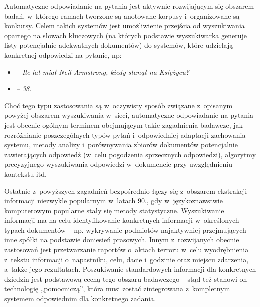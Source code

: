 \begin{multicols}{2}
Automatyczne odpowiadanie na pytania jest aktywnie rozwijającym się
obszarem badań, w~którego ramach tworzone są anotowane korpusy
i~organizowane są konkursy. Celem takich systemów jest umożliwienie
przejścia od wyszukiwania opartego na słowach kluczowych (na
których podstawie wyszukiwarka generuje listy potencjalnie
adekwatnych dokumentów) do systemów, które udzielają konkretnej
odpowiedzi na pytanie, np: 

\begin{itemize} 
  \item[] \textit{– Ile lat miał Neil Armstrong,
kiedy stanął na Księżycu?} 
  \item[] \textit{– 38. } 
\end{itemize} 

Choć tego typu zastosowania są w~oczywisty sposób związane
z~opisanym powyżej obszarem wyszukiwania w~sieci, automatyczne
odpowiadanie na pytania jest obecnie ogólnym terminem obejmującym
takie zagadnienia badawcze, jak rozróżnianie poszczególnych typów
pytań i~odpowiedniej adaptacji zachowania systemu, metody analizy
i~porównywania zbiorów dokumentów potencjalnie zawierających
odpowiedź (w~celu pogodzenia sprzecznych odpowiedzi), algorytmy
precyzyjnego wyszukiwania odpowiedzi w~dokumencie przy uwzględnieniu
kontekstu itd. 

Ostatnie z~powyższych zagadnień bezpośrednio łączy się
z~obszarem ekstrakcji informacji niezwykle popularnym w~latach 90.,
gdy w~językoznawstwie komputerowym popularne stały się metody
statystyczne. Wyszukiwanie informacji ma na celu identyfikowanie
konkretnych informacji w~określonych typach dokumentów – np.
wykrywanie podmiotów najaktywniej przejmujących inne spółki na
podstawie doniesień prasowych. Innym z~rozwijanych obecnie
zastosowań jest przetwarzanie raportów o~aktach terroru w~celu
wyodrębnienia z~tekstu informacji o~napastniku, celu, dacie
i~godzinie oraz miejscu zdarzenia, a~także jego rezultatach.
Poszukiwanie standardowych informacji dla konkretnych dziedzin jest
podstawową cechą tego obszaru badawczego – stąd też stanowi on
technologię „pomocniczą”, która musi zostać zintegrowana
z~kompletnym systemem odpowiednim dla konkretnego zadania. 



\end{multicols}
